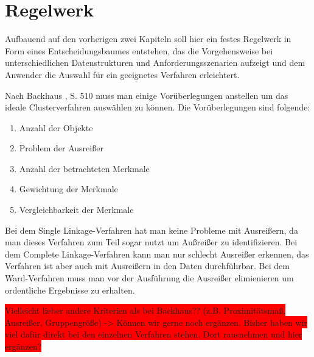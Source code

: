 \chapter{Regelwerk}

Aufbauend auf den vorherigen zwei Kapiteln soll hier ein festes Regelwerk in Form eines Entscheidungsbaumes entstehen, das die Vorgehensweise bei unterschiedlichen Datenstrukturen und Anforderungsszenarien aufzeigt und dem Anwender die Auswahl für ein geeignetes Verfahren erleichtert.

Nach Backhaus \cite{Backhaus.2016}, S. 510 muss man einige Vorüberlegungen anstellen um das ideale Clusterverfahren auswählen zu können. Die Vorüberlegungen sind folgende:
\begin{enumerate}
    \item Anzahl der Objekte
    \item Problem der Ausreißer
    \item Anzahl der betrachteten Merkmale
    \item Gewichtung der Merkmale
    \item Vergleichbarkeit der Merkmale
\end{enumerate}



Bei dem Single Linkage-Verfahren hat man keine Probleme mit Ausreißern, da man dieses Verfahren zum Teil sogar nutzt um Außreißer zu identifizieren. Bei dem Complete Linkage-Verfahren kann man nur schlecht Ausreißer erkennen, das Verfahren ist aber auch mit Ausreißern in den Daten durchführbar. Bei dem Ward-Verfahren muss man vor der Ausführung die Ausreißer elimienieren um ordentliche Ergebnisse zu erhalten.

\colorbox{red}{Vielleicht lieber andere Kriterien als bei Backhaus?? (z.B. Proximitätsmaß, Ausreißer, Gruppengröße) -> Können wir gerne noch ergänzen. Bisher haben wir viel dafür direkt bei den einzelnen Verfahren stehen. Dort rausnehmen und hier ergänzen?}
